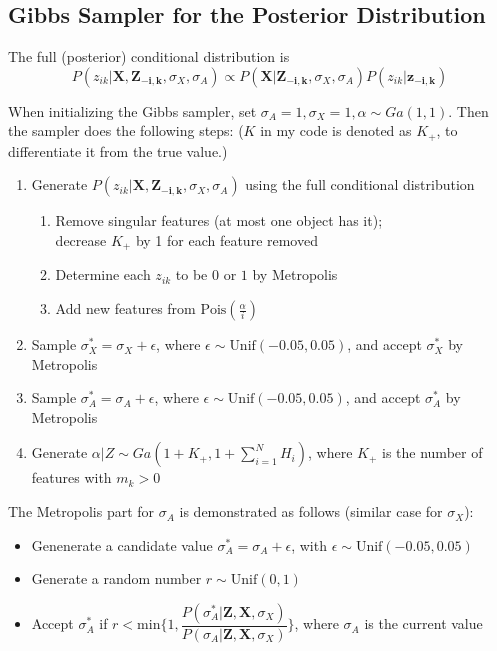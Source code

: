 \subsection{Gibbs Sampler for the Posterior Distribution}

The full (posterior) conditional distribution is
\begin{equation}
P(z_{ik} | \mathbf{X,Z_{-i,k}},\sigma_X, \sigma_A) \propto P(\mathbf{X} | \mathbf{Z_{-i,k}},\sigma_X, \sigma_A) P(z_{ik} | \mathbf{z_{-i,k}})
\end{equation}

When initializing the Gibbs sampler, set $\sigma_A = 1, \sigma_X = 1, \alpha \sim Ga(1,1)$. Then the sampler does the following steps: ($K$ in my code is denoted as $K_+$, to differentiate it from the true value.)

\begin{enumerate}
\item Generate $P(z_{ik} | \mathbf{X,Z_{-i,k}},\sigma_X, \sigma_A)$ using the full conditional distribution
    \begin{enumerate}
    \item Remove singular features (at most one object has it);\\
    decrease $K_+$ by 1 for each feature removed
    \item Determine each $z_{ik}$ to be $0$ or $1$ by Metropolis
    \item Add new features from $\text{Pois}(\frac{\alpha}{i})$
    \end{enumerate}
\item Sample $\sigma_{X}^* = \sigma_X + \epsilon$, where $\epsilon \sim \text{Unif}(-0.05,0.05)$, and accept $\sigma_{X}^*$ by Metropolis 
\item Sample $\sigma_{A}^* = \sigma_A + \epsilon$, where $\epsilon \sim \text{Unif}(-0.05,0.05)$, and accept $\sigma_{A}^*$ by Metropolis 
\item Generate $\alpha|Z \sim Ga(1+K_+,1+\sum^{N}_{i=1}H_i)$, where $K_+$ is the number of features with $m_k > 0$
\end{enumerate}

The Metropolis part for $\sigma_A$ is demonstrated as follows (similar case for $\sigma_X$):
\begin{itemize}
\item Genenerate a candidate value $\sigma_{A}^{*} = \sigma_{A} + \epsilon$, with $\epsilon \sim \text{Unif}(-0.05,0.05)$
\item Generate a random number $r \sim \text{Unif}(0,1)$
\item Accept $\sigma_{A}^{*}$ if $r < \text{min}\{ 1, \dfrac{P(\sigma_{A}^{*} | \mathbf{Z,X},\sigma_X)}{P(\sigma_{A} | \mathbf{Z,X},\sigma_X)} \}$, where $\sigma_{A}$ is the current value
\end{itemize}

